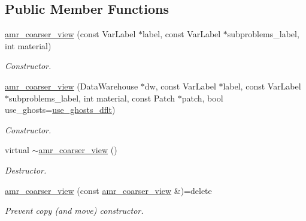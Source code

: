 \subsection*{Public Member Functions}
\begin{DoxyCompactItemize}
\item 
\hyperlink{classUintah_1_1PhaseField_1_1detail_1_1amr__coarser__view_3_01ScalarField_3_01T_01_4_00_01Proble9cadea116dab5bdb44bb3e29abbe99ef_a028eef83d6df8dcc30eddb8595f628c3}{amr\+\_\+coarser\+\_\+view} (const Var\+Label $\ast$label, const Var\+Label $\ast$subproblems\+\_\+label, int material)
\begin{DoxyCompactList}\small\item\em Constructor. \end{DoxyCompactList}\item 
\hyperlink{classUintah_1_1PhaseField_1_1detail_1_1amr__coarser__view_3_01ScalarField_3_01T_01_4_00_01Proble9cadea116dab5bdb44bb3e29abbe99ef_a67cbe6e1cb69a42c0669e7a477d5e403}{amr\+\_\+coarser\+\_\+view} (Data\+Warehouse $\ast$dw, const Var\+Label $\ast$label, const Var\+Label $\ast$subproblems\+\_\+label, int material, const Patch $\ast$patch, bool use\+\_\+ghosts=\hyperlink{classUintah_1_1PhaseField_1_1detail_1_1amr__coarser__view_3_01ScalarField_3_01T_01_4_00_01Proble9cadea116dab5bdb44bb3e29abbe99ef_ace77967592bbb525ac1e29555bb317cd}{use\+\_\+ghosts\+\_\+dflt})
\begin{DoxyCompactList}\small\item\em Constructor. \end{DoxyCompactList}\item 
virtual \hyperlink{classUintah_1_1PhaseField_1_1detail_1_1amr__coarser__view_3_01ScalarField_3_01T_01_4_00_01Proble9cadea116dab5bdb44bb3e29abbe99ef_ae7ef0e8e785d39a1813d9d05f0e2154e}{$\sim$amr\+\_\+coarser\+\_\+view} ()
\begin{DoxyCompactList}\small\item\em Destructor. \end{DoxyCompactList}\item 
\hyperlink{classUintah_1_1PhaseField_1_1detail_1_1amr__coarser__view_3_01ScalarField_3_01T_01_4_00_01Proble9cadea116dab5bdb44bb3e29abbe99ef_ae8ffacd55d47c21178637fc1a8e9e5b0}{amr\+\_\+coarser\+\_\+view} (const \hyperlink{classUintah_1_1PhaseField_1_1detail_1_1amr__coarser__view}{amr\+\_\+coarser\+\_\+view} \&)=delete
\begin{DoxyCompactList}\small\item\em Prevent copy (and move) constructor. \end{DoxyCompactList}\item 

\end{DoxyCompactItemize}
